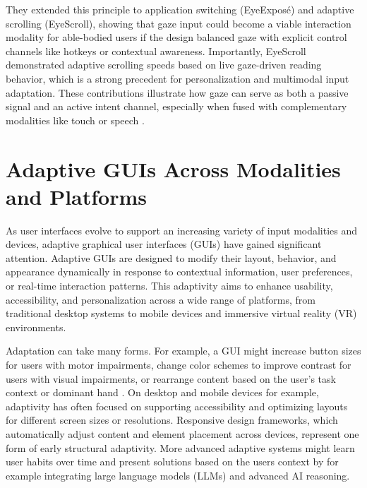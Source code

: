 \documentclass[openany]{book}
\begin{document}
They extended this principle to application switching (EyeExposé) and adaptive scrolling (EyeScroll), showing that gaze input could become a viable interaction modality for able-bodied users if the design balanced gaze with explicit control channels like hotkeys or contextual awareness. Importantly, EyeScroll demonstrated adaptive scrolling speeds based on live gaze-driven reading behavior, which is a strong precedent for personalization and multimodal input adaptation. These contributions illustrate how gaze can serve as both a passive signal and an active intent channel, especially when fused with complementary modalities like touch or speech \cite{kumar2007guide2}. 


\section{Adaptive GUIs Across Modalities and Platforms}
As user interfaces evolve to support an increasing variety of input modalities and devices, adaptive graphical user interfaces (GUIs) have gained significant attention. Adaptive GUIs are designed to modify their layout, behavior, and appearance dynamically in response to contextual information, user preferences, or real-time interaction patterns. This adaptivity aims to enhance usability, accessibility, and personalization across a wide range of platforms, from traditional desktop systems to mobile devices and immersive virtual reality (VR) environments.

Adaptation can take many forms. For example, a GUI might increase button sizes for users with motor impairments, change color schemes to improve contrast for users with visual impairments, or rearrange content based on the user's task context or dominant hand \cite{Gajos2008SUPPLE}. On desktop and mobile devices for example, adaptivity has often focused on supporting accessibility and optimizing layouts for different screen sizes or resolutions. Responsive design frameworks, which automatically adjust content and element placement across devices, represent one form of early structural adaptivity. More advanced adaptive systems might learn user habits over time and present solutions based on the users context by for example integrating large language models (LLMs) and advanced AI reasoning.
\end{document}
